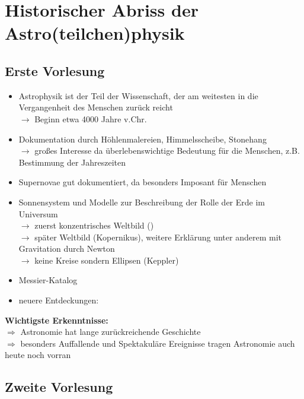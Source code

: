 \section{Historischer Abriss der Astro(teilchen)physik}

\subsection{Erste Vorlesung}
\begin{itemize}
\item Astrophysik ist der Teil der Wissenschaft, der am weitesten in die Vergangenheit des Menschen zurück reicht\\
      $\longrightarrow$ Beginn etwa 4000 Jahre v.Chr.
\item  Dokumentation durch Höhlenmalereien, Himmelsscheibe, Stonehang\\
      $\longrightarrow$ großes Interesse da überlebenswichtige Bedeutung für die Menschen, z.B. Bestimmung der Jahreszeiten
\item Supernovae gut dokumentiert, da besonders Imposant für Menschen
\item Sonnensystem und Modelle zur Beschreibung der Rolle der Erde im Universum\\
  	 $\longrightarrow$ zuerst konzentrisches Weltbild ()\\
     $\longrightarrow$ später Weltbild (Kopernikus), weitere Erklärung unter anderem mit Gravitation durch Newton\\
     $\longrightarrow$ keine Kreise sondern Ellipsen (Keppler)
\item Messier-Katalog
\item neuere Entdeckungen:

\end{itemize}

\textbf{Wichtigste Erkenntnisse:}\\
$\Longrightarrow$ Astronomie hat lange zurückreichende Geschichte\\
$\Longrightarrow$ besonders Auffallende und Spektakuläre Ereignisse tragen Astronomie auch heute noch vorran

\subsection{Zweite Vorlesung}
